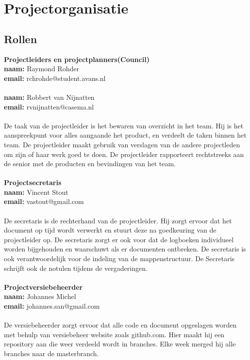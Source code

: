 \chapter{Projectorganisatie} \label{cha:your-first-document}


\section{Rollen} \label{sec:basics}

\textbf{Projectleiders en projectplanners(Council)}\\
\textbf{naam:}	Raymond Rohder\\
\textbf{email:}	rchrohde@student.avans.nl\\
\\
\textbf{naam:}	Robbert van Nijnatten\\
\textbf{email:}	rvnijnatten@casema.nl\\
\\
De taak van de projectleider is het bewaren van overzicht in het team. Hij is het aanspreekpunt voor alles aangaande het product, en verdeelt de taken binnen het team. De projectleider maakt gebruik van verslagen van de andere projectleden om zijn of haar werk goed te doen. De projectleider rapporteert rechtstreeks aan de senior met de producten en bevindingen van het team.\\
\\
\textbf{Projectsecretaris}\\
\textbf{naam:}	Vincent Stout\\
\textbf{email:}	vastout@gmail.com\\
\\
De secretaris is de rechterhand van de projectleider. Hij zorgt ervoor dat het document op tijd wordt verwerkt en stuurt deze na goedkeuring van de projectleider op. De secretaris zorgt er ook voor dat de logboeken individueel worden bijgehouden en waarschuwt als er documenten ontbreken. De secretaris is ook verantwoordelijk voor de indeling van de mappenstructuur.
De Secretaris schrijft ook de notulen tijdens de vergaderingen.\\
\\
\textbf{Projectversiebeheerder}\\
\textbf{naam:}	Johannes Michel\\
\textbf{email:}	johannes.san@gmail.com\\
\\
De versiebeheerder zorgt ervoor dat alle code en document opgeslagen worden met behulp van versiebeheer website zoals github.com. Hier maakt hij een repository aan die weer verdeeld wordt in branches. Elke week merged hij alle branches naar de masterbranch.\\
